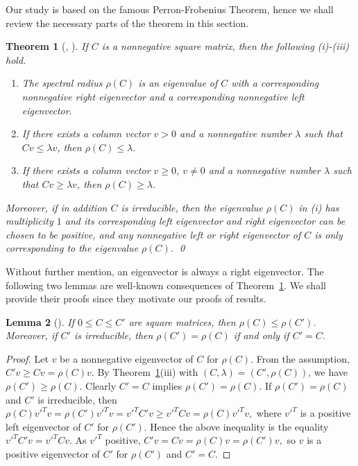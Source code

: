 \documentclass[final,3p, times, 12pt]{elsarticle}
\theoremstyle{plain}
\newtheorem{thm}{Theorem}[section]
\newtheorem{lem}[thm]{Lemma}
\theoremstyle{definition}
\theoremstyle{remark}
\numberwithin{equation}{section}
\begin{document}
Our study is based on the famous Perron-Frobenius Theorem, hence we shall review the necessary parts of the theorem in this section.


\begin{thm}[{\cite[Theorem 2.2.1]{Brou}, \cite[Corollary 8.1.29, Theorem 8.3.2]{Horn}}]\label{PF}
If $C$ is a nonnegative square matrix, then the following (i)-(iii) hold.
\begin{enumerate}
\item[(i)] The spectral radius $\rho(C)$ is an eigenvalue of $C$ with a corresponding nonnegative right eigenvector and a corresponding nonnegative left eigenvector.
\item[(ii)] If there exists a column vector $v> 0$ and a nonnegative number $\lambda$ such that $Cv\leq \lambda v$, then $\rho(C)\leq\lambda$.
\item[(iii)] If there exists a column vector $v\geq 0$, $v\not=0$  and a nonnegative number $\lambda$ such that  $Cv\geq \lambda v$, then  $\rho(C)\geq\lambda$.
\end{enumerate}
Moreover, if in addition  $C$ is irreducible, then
 the eigenvalue $\rho(C)$ in (i) has multiplicity $1$ and its corresponding left eigenvector and right eigenvector can be chosen to be positive, and any nonnegative left or right eigenvector of $C$ is only corresponding to the eigenvalue $\rho(C)$.
 \qed
\end{thm}


Without further mention, an eigenvector is always a right eigenvector.
The following two lemmas are  well-known consequences of Theorem~\ref{PF}. We shall provide their proofs since they motivate our  proofs of results.

\begin{lem}[{\cite[Theorem 2.2.1]{Brou}}]\label{lem1.2}
If $0\leq C\leq C'$ are square matrices, then $\rho(C)\leq\rho(C')$. Moreover, if $C'$ is irreducible,
then $\rho(C')=\rho(C)$  if and only if $C'=C$.
\end{lem}
\begin{proof}
 Let $v$ be  a nonnegative eigenvector of $C$ for $\rho(C)$. From the assumption,  $C'v\geq Cv=\rho(C)v$.
 By Theorem~\ref{PF}(iii) with $(C, \lambda)=(C', \rho(C))$, we have  $\rho(C')\geq \rho(C).$
   Clearly $C'=C$ implies $\rho(C')=\rho(C)$.
 If $\rho(C')=\rho(C)$ and $C'$ is irreducible, then
 $\rho(C)v'^Tv=\rho(C') v'^Tv=v'^TC'v\geq v'^TCv= \rho(C)v'^Tv,$
 where $v'^T$ is a positive left eigenvector of $C'$ for $\rho(C').$
 Hence the above inequality is the equality $v'^TC'v=v'^TCv$.  As $v'^T$ positive,
  $C'v=Cv=\rho(C)v=\rho(C')v,$ so $v$ is a positive eigenvector of $C'$ for $\rho(C')$ and $C'=C.$
 \end{proof}
\end{document}
